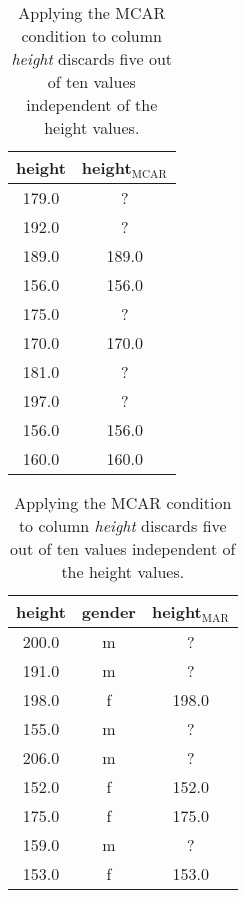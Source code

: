 \begin{table}
	\centering
\begin{minipage}{0.28\textwidth}
\centering
	\begin{tabular}{cc}
\toprule
 height &  height$_{\text{MCAR}}$ \\
\midrule
  179.0 &                     ? \\
  192.0 &                     ? \\
  189.0 &                 189.0 \\
  156.0 &                 156.0 \\
  175.0 &                     ? \\
  170.0 &                 170.0 \\
  181.0 &                     ? \\
  197.0 &                     ? \\
  156.0 &                 156.0 \\
  160.0 &                 160.0 \\
\bottomrule
\end{tabular}
\caption{
		Applying the MCAR condition to column \textit{height} discards five out of ten values independent of the height values.
	}
	\label{tab:missingness_patterns_MCAR}
\vspace{2em}
\end{minipage}
\hfill
\begin{minipage}{0.3\textwidth}
\centering
	\begin{tabular}{ccc}
\toprule
 height & gender &  height$_{\text{MAR}}$ \\
\midrule
  200.0 &      m &                    ? \\
  191.0 &      m &                    ? \\
  198.0 &      f &                198.0 \\
  155.0 &      m &                    ? \\
  206.0 &      m &                    ? \\
  152.0 &      f &                152.0 \\
  175.0 &      f &                175.0 \\
  159.0 &      m &                    ? \\
  153.0 &      f &                153.0 \\

\end{tabular}
\end{minipage}
\end{table}
